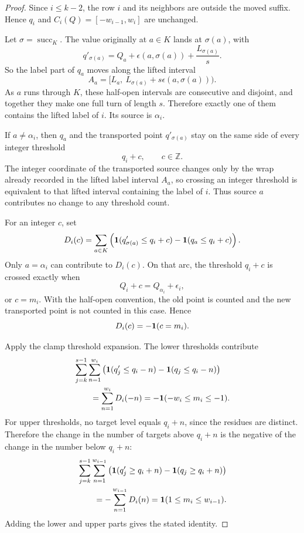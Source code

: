 \documentclass[10pt]{article}
\begin{document}
\begin{proof}
Since \(i\le k-2\), the row \(i\) and its neighbors are outside the moved
suffix.  Hence \(q_i\) and \(C_i(Q)=[-w_{i-1},w_i]\) are unchanged.

Let \(\sigma=\operatorname{succ}_K\).  The value originally at \(a\in K\)
lands at \(\sigma(a)\), with
\[
  q'_{\sigma(a)}
  =
  Q_a+\epsilon(a,\sigma(a))+\frac{L_{\sigma(a)}}s.
\]
So the label part of \(q_a\) moves along the lifted interval
\[
  A_a=[L_a,\ L_{\sigma(a)}+s\epsilon(a,\sigma(a))).
\]
As \(a\) runs through \(K\), these half-open intervals are consecutive and
disjoint, and together they make one full turn of length \(s\).  Therefore
exactly one of them contains the lifted label of \(i\).  Its source is
\(\alpha_i\).

If \(a\ne\alpha_i\), then \(q_a\) and the transported point
\(q'_{\sigma(a)}\) stay on the same side of every integer threshold
\[
  q_i+c,\qquad c\in\mathbb Z.
\]
The integer coordinate of the transported source changes only by the wrap
already recorded in the lifted label interval \(A_a\), so crossing an integer
threshold is equivalent to that lifted interval containing the label of \(i\).
Thus source \(a\) contributes no change to any threshold count.

For an integer \(c\), set
\[
  D_i(c)=
  \sum_{a\in K}
  \left(
    {\bf 1}(q'_{\sigma(a)}\le q_i+c)
    -
    {\bf 1}(q_a\le q_i+c)
  \right).
\]
Only \(a=\alpha_i\) can contribute to \(D_i(c)\).  On that arc, the threshold
\(q_i+c\) is crossed exactly when
\[
  Q_i+c=Q_{\alpha_i}+\epsilon_i,
\]
or \(c=m_i\).  With the half-open convention, the old point is counted and the
new transported point is not counted in this case.  Hence
\[
  D_i(c)=-{\bf 1}(c=m_i).
\]

Apply the clamp threshold expansion.  The lower thresholds contribute
\[
\begin{aligned}
&\sum_{j=k}^{s-1}
\sum_{n=1}^{w_i}
\left(
  {\bf 1}(q'_j\le q_i-n)
  -
  {\bf 1}(q_j\le q_i-n)
\right)\\
&\qquad=
\sum_{n=1}^{w_i}D_i(-n)
=
-{\bf 1}(-w_i\le m_i\le -1).
\end{aligned}
\]
For upper thresholds, no target level equals \(q_i+n\), since the residues are
distinct.  Therefore the change in the number of targets above \(q_i+n\) is
the negative of the change in the number below \(q_i+n\):
\[
\begin{aligned}
&\sum_{j=k}^{s-1}
\sum_{n=1}^{w_{i-1}}
\left(
  {\bf 1}(q'_j\ge q_i+n)
  -
  {\bf 1}(q_j\ge q_i+n)
\right)\\
&\qquad=
-\sum_{n=1}^{w_{i-1}}D_i(n)
=
{\bf 1}(1\le m_i\le w_{i-1}).
\end{aligned}
\]
Adding the lower and upper parts gives the stated identity.
\end{proof}
\end{document}
